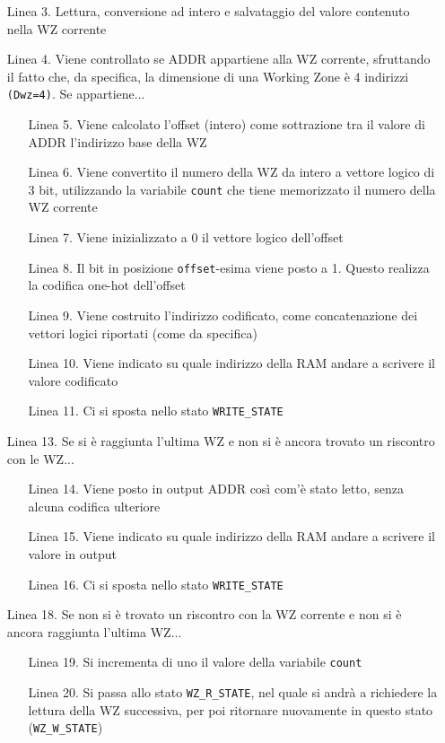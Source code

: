 \documentclass{article}
\begin{document}
\begin{itemize}[align=left, labelwidth=4em, leftmargin=1.8cm]
\item[Linea 3.] Lettura, conversione ad intero e salvataggio del valore contenuto nella WZ corrente
\item[Linea 4.] Viene controllato se ADDR appartiene alla WZ corrente, sfruttando il fatto che, da specifica, la dimensione di una Working Zone è 4 indirizzi \verb^(Dwz=4)^. Se appartiene...
\begin{itemize}[align=left, labelwidth=4em, leftmargin=1.8cm]
\item[Linea 5.] Viene calcolato l'offset (intero) come sottrazione tra il valore di ADDR l'indirizzo base della WZ
\item[Linea 6.] Viene convertito il numero della WZ da intero a vettore logico di 3 bit, utilizzando la variabile \verb^count^ che tiene memorizzato il numero della WZ corrente
\item[Linea 7.] Viene inizializzato a 0 il vettore logico dell'offset
\item[Linea 8.] Il bit in posizione \verb^offset^-esima viene posto a 1. Questo realizza la codifica one-hot dell'offset 
\item[Linea 9.] Viene costruito l'indirizzo codificato, come concatenazione dei vettori logici riportati (come da specifica)
\item[Linea 10.] Viene indicato su quale indirizzo della RAM andare a scrivere il valore codificato
\item[Linea 11.] Ci si sposta nello stato \verb^WRITE_STATE^
\end{itemize}
\item[Linea 13.] Se si è raggiunta l'ultima WZ e non si è ancora trovato un riscontro con le WZ...
\begin{itemize}[align=left, labelwidth=4em, leftmargin=1.8cm]
\item[Linea 14.] Viene posto in output ADDR così com'è stato letto, senza alcuna codifica ulteriore
\item[Linea 15.] Viene indicato su quale indirizzo della RAM andare a scrivere il valore in output
\item[Linea 16.] Ci si sposta nello stato \verb^WRITE_STATE^
\end{itemize}
\item[Linea 18.] Se non si è trovato un riscontro con la WZ corrente e non si è ancora raggiunta l'ultima WZ...
\begin{itemize}[align=left, labelwidth=4em, leftmargin=1.8cm]
\item[Linea 19.] Si incrementa di uno il valore della variabile \verb^count^
\item[Linea 20.] Si passa allo stato \verb^WZ_R_STATE^, nel quale si andrà a richiedere la lettura della WZ successiva, per poi ritornare nuovamente in questo stato (\verb^WZ_W_STATE^)
\end{itemize}

\end{itemize}
\end{document}
